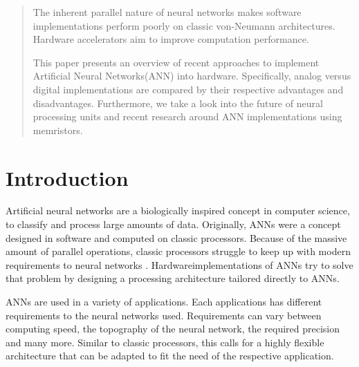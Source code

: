 \documentclass[conference]{IEEEtran}
\begin{document}
    \maketitle

    \begin{abstract}
        The inherent parallel nature of neural networks makes software implementations perform poorly on classic
        von-Neumann architectures.
        Hardware accelerators aim to improve computation performance.

        This paper presents an overview of recent approaches to implement Artificial Neural Networks(ANN) into hardware.
        Specifically, analog versus digital implementations are compared by their respective advantages and disadvantages.
        Furthermore, we take a look into the future of neural processing units and recent research around ANN implementations using memristors.
    \end{abstract}





    \IEEEpeerreviewmaketitle



    \section{Introduction}

    Artificial neural networks are a biologically inspired concept in computer science, to classify and process large amounts of data.
    Originally, ANNs were a concept designed in software and computed on classic processors.
    Because of the massive amount of parallel operations, classic processors struggle to keep up with modern requirements to neural networks \cite{forssell2014hardware}.
    Hardwareimplementations of ANNs try to solve that problem by designing a processing architecture tailored directly to ANNs.

    ANNs are used in a variety of applications.
    Each applications has different requirements to the neural networks used.
    Requirements can vary between computing speed, the topography of the neural network, the required precision and many more.
    Similar to classic processors, this calls for a highly flexible architecture that can be adapted to fit the need of the respective application.
\end{document}
